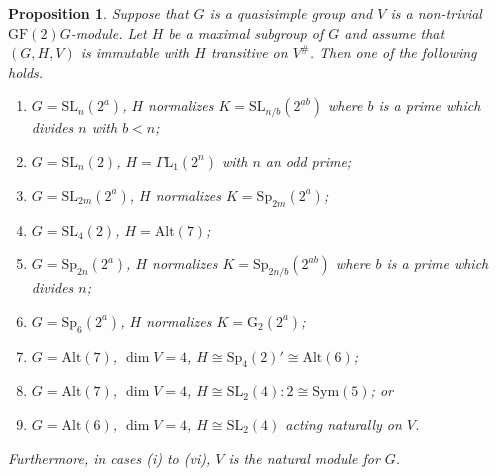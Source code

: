 \documentclass[12pt]{amsart}
\newtheorem{proposition}[theorem]{Proposition}
\theoremstyle{remark}
\theoremstyle{notation}
\theoremstyle{definition}
\newcommand{\G}{\mathrm{G}}
\newcommand{\GF}{\mathrm{GF}}
\newcommand{\Sp}{\mathrm{Sp}}
\newcommand{\SL}{\mathrm{SL}}
\newcommand{\0}{\emptyset}
\newcommand{\Sym}{\mathrm{Sym}}
\newcommand{\Alt}{\mathrm{Alt}}
\begin{document}
\begin{proposition}\label{prop:trans cases} Suppose that $G$ is a quasisimple group and $V$ is a non-trivial $\GF(2)G$-module.  Let $H$ be a maximal subgroup of $G$ and assume that $(G,H,V)$ is immutable with $H$ transitive on $V^\#$. Then one of the following holds.
\begin{enumerate}
\item  $G=\SL_n(2^a)$, $H$ normalizes $K=\SL_{n/b}(2^{ab})$ where $b$ is a prime which divides $n$ with $b<n$;
    \item  $G=\SL_n(2 )$, $H =\Gamma \mathrm L_1(2^n)$ with $n$  an odd prime;
\item   $G= \SL_{2m}(2^a)$, $H$ normalizes $K=\Sp_{2m}(2^a)$;
\item  $G=\SL_{4}(2)$, $H=\Alt(7)$;
\item   $G= \Sp_{2n}(2^a)$, $H$ normalizes $K=\Sp_{2n/b}(2^{ab})$ where $b$ is a prime which divides $n$;
\item  $G =\Sp_6(2^a)$, $H$ normalizes $K=\G_2(2^a)$;
\item  $G=  \Alt(7)$, $\dim V=4$, $H\cong \Sp_4(2)'\cong \Alt(6)$;
    \item  $G=  \Alt(7)$, $\dim V=4$, $H \cong \SL_2(4){:}2 \cong \Sym(5)$; or
\item  $G=  \Alt(6)$, $\dim V=4$, $H \cong \SL_2(4)$ acting naturally on $V$.
\end{enumerate}
Furthermore, in cases (i) to (vi), $V$ is the natural module for $G$.
\end{proposition}
\end{document}
